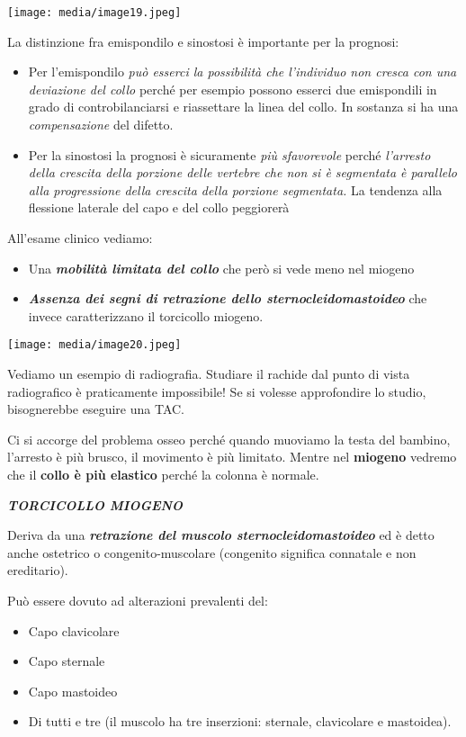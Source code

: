 \documentclass[]{article}
\begin{document}
\texttt{[image: media/image19.jpeg]}

La distinzione fra emispondilo e sinostosi è importante per la prognosi:

\begin{itemize}
\item
  Per l'emispondilo \emph{può esserci la possibilità che l'individuo non
  cresca con una deviazione del collo} perché per esempio possono
  esserci due emispondili in grado di controbilanciarsi e riassettare la
  linea del collo. In sostanza si ha una \emph{compensazione} del
  difetto.
\item
  Per la sinostosi la prognosi è sicuramente \emph{più sfavorevole}
  perché \emph{l'arresto della crescita della porzione delle vertebre
  che non si è segmentata è parallelo alla progressione della crescita
  della porzione segmentata.} La tendenza alla flessione laterale del
  capo e del collo peggiorerà
\end{itemize}

All'esame clinico vediamo:

\begin{itemize}
\item
  Una \textbf{\emph{mobilità limitata del collo}} che però si vede meno
  nel miogeno
\item
  \textbf{\emph{Assenza dei segni di retrazione dello
  sternocleidomastoideo}} che invece caratterizzano il torcicollo
  miogeno.
\end{itemize}

\texttt{[image: media/image20.jpeg]}

Vediamo un esempio di radiografia. Studiare il rachide dal punto di
vista radiografico è praticamente impossibile! Se si volesse
approfondire lo studio, bisognerebbe eseguire una TAC.

Ci si accorge del problema osseo perché quando muoviamo la testa del
bambino, l'arresto è più brusco, il movimento è più limitato. Mentre nel
\textbf{miogeno} vedremo che il \textbf{collo è più elastico} perché la
colonna è normale.

\emph{\textbf{TORCICOLLO MIOGENO}}

Deriva da una \textbf{\emph{retrazione del muscolo
sternocleidomastoideo}} ed è detto anche ostetrico o congenito-muscolare
(congenito significa connatale e non ereditario).

Può essere dovuto ad alterazioni prevalenti del:

\begin{itemize}
\item
  Capo clavicolare
\item
  Capo sternale
\item
  Capo mastoideo
\item
  Di tutti e tre (il muscolo ha tre inserzioni: sternale, clavicolare e
  mastoidea).
\end{itemize}
\end{document}

